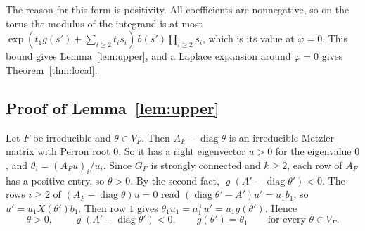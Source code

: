 The reason for this form is positivity. All coefficients are nonnegative, so
on the torus the modulus of the integrand is at most
$\exp(t_1g(s')+\sum_{i\ge2}t_is_i)\,b(s')\prod_{i\ge2}s_i$, which is its
value at $\varphi=0$. This bound gives Lemma~\ref{lem:upper}, and a Laplace
expansion around $\varphi=0$ gives Theorem~\ref{thm:local}.

\subsection{Proof of Lemma~\texorpdfstring{\ref{lem:upper}}{3.2}}

Let $F$ be irreducible and $\theta\in V_F$. Then $A_F-\operatorname{diag}\theta$
is an irreducible Metzler matrix with Perron root $0$. So it has a right
eigenvector $u>0$ for the eigenvalue $0$, and
$\theta_i=(A_Fu)_i/u_i$. Since $G_F$ is strongly connected and $k\ge2$, each
row of $A_F$ has a positive entry, so $\theta>0$. By the second fact,
$\varrho(A'-\operatorname{diag}\theta')<0$. The rows $i\ge2$ of
$(A_F-\operatorname{diag}\theta)u=0$ read
$(\operatorname{diag}\theta'-A')u'=u_1b_1$, so $u'=u_1X(\theta')b_1$. Then
row $1$ gives $\theta_1u_1=a_1^\top u'=u_1g(\theta')$. Hence
\begin{equation}\label{eq:A-radii}
\theta>0,\qquad \varrho(A'-\operatorname{diag}\theta')<0,\qquad
g(\theta')=\theta_1\qquad\text{for every }\theta\in V_F .
\end{equation}

